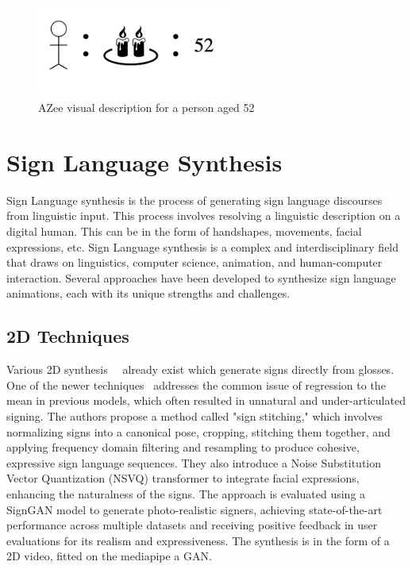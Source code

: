\documentclass[../../main.tex]{subfiles}
\begin{document}
\begin{figure}
  \centering \includegraphics[width = 2.5in]{chapters/background_work/images/azvd.png}
  \caption{AZee visual description for a person aged 52}
  \label{fig:azvd}
\end{figure}

\section{Sign Language Synthesis}
\label{ch:background_work:sign_language_synthesis}

Sign Language synthesis is the process of generating sign language discourses from linguistic input. This process involves resolving a linguistic description on a digital human. This can be in the form of handshapes, movements, facial expressions, etc. Sign Language synthesis is a complex and interdisciplinary field that draws on linguistics, computer science, animation, and human-computer interaction. Several approaches have been developed to synthesize sign language animations, each with its unique strengths and challenges.

\subsection{2D Techniques}
\label{ch:background_work:sign_language_synthesis:2d_techniques}

Various 2D synthesis~\cite{jiang2024signclipconnectingtextsign}~\cite{moryossef2024signmtrealtimemultilingualsign} already exist which generate signs directly from glosses. One of the newer techniques~\cite{walsh2024sign} addresses the common issue of regression to the mean in previous models, which often resulted in unnatural and under-articulated signing. The authors propose a method called "sign stitching," which involves normalizing signs into a canonical pose, cropping, stitching them together, and applying frequency domain filtering and resampling to produce cohesive, expressive sign language sequences. They also introduce a Noise Substitution Vector Quantization (NSVQ) transformer to integrate facial expressions, enhancing the naturalness of the signs. The approach is evaluated using a SignGAN model to generate photo-realistic signers, achieving state-of-the-art performance across multiple datasets and receiving positive feedback in user evaluations for its realism and expressiveness. The synthesis is in the form of a 2D video, fitted on the mediapipe a GAN.
\end{document}
